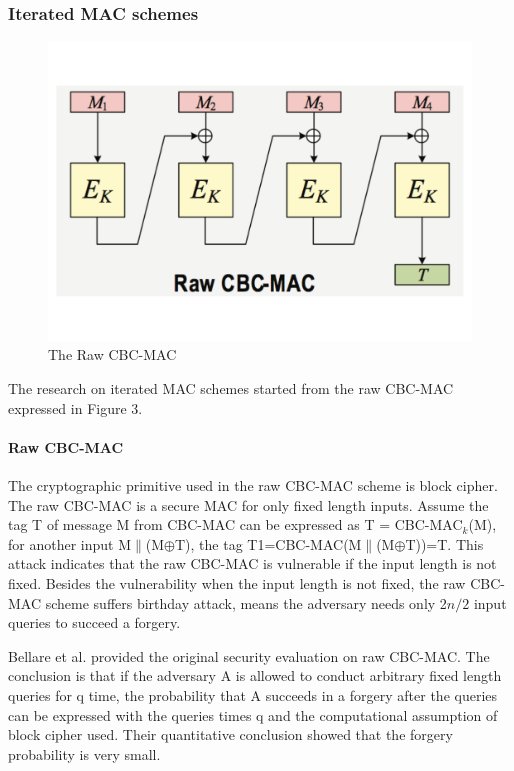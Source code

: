 \documentclass{article}
\begin{document}
\subsubsection{Iterated MAC schemes}
\begin{figure}[htbp]
\centering
\includegraphics[scale=0.3]{./diagram/cbc-mac.pdf}
\caption{The Raw CBC-MAC}
\label{fig:3 }
\end{figure}
The research on iterated MAC schemes started from the raw CBC-MAC expressed in Figure 3.
\paragraph{Raw CBC-MAC}
The cryptographic primitive used in the raw CBC-MAC scheme is block cipher.  
The raw CBC-MAC is a secure MAC for only fixed length inputs. Assume the tag T of message M from CBC-MAC can be expressed as T = CBC-MAC$_k$(M), for another input M$\|$(M$\oplus$T), the tag T1=CBC-MAC(M$\|$(M$\oplus$T))=T. This attack indicates that the raw CBC-MAC is vulnerable if the input length is not fixed.
Besides the vulnerability when the input length is not fixed, the raw CBC-MAC scheme suffers birthday attack, means the adversary needs only 2$n/2$ input queries to succeed a forgery. 

Bellare et al. provided the original security evaluation on raw CBC-MAC\cite{cbc1994}. The conclusion is that if the adversary A is allowed to conduct arbitrary fixed length queries for q time, the probability that A succeeds in a forgery after the queries can be expressed with the queries times q and the computational assumption of block cipher used. Their quantitative conclusion showed that the forgery probability is very small.
\end{document}
